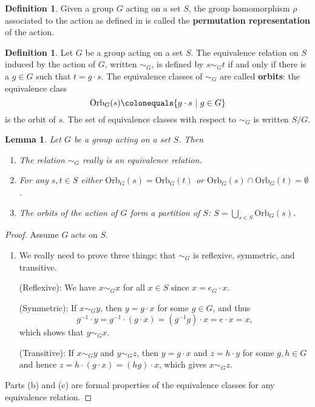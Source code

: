 \documentclass[12pt]{report}
\newtheorem{lemma}[theorem]{Lemma}
\numberwithin{equation}{section}
\numberwithin{theorem}{chapter}
\theoremstyle{definition}
\newtheorem{definition}[theorem]{Definition}
\newtheorem*{basic properties}{Basic Properties}
\newtheorem*{Important Remark}{Important Remark}
\newcommand{\df}[1]{{\bf #1}\index{#1}}
\begin{document}
\begin{definition}
	Given a group $G$ acting on a set $S$, the group homomorphism $\rho$ associated to the action as defined in  is called the \df{permutation representation} of the action.
\end{definition}










\begin{definition}
 Let $G$ be a group acting on a set $S$. The equivalence relation on $S$ induced by the action of $G$, written $\sim_G$, is defined by $s\sim_G t$ if and only if there is a $g \in G$ such that $t=g\cdot s$.  The equivalence classes of $\sim_G$ are called {\bf orbits}: the equivalence class
 $$\mathrm{Orb}_G(s) \colonequals \{g\cdot s \ | \ g\in G\}$$ 
 is the orbit of $s$. The set of equivalence classes with respect to $\sim_G$ is written $S/G$.
 \end{definition}
 
 



 
\begin{lemma}
Let $G$ be a group acting on a set $S$. Then 
\begin{enumerate}[label=(\alph*)]
\item The relation $\sim_G$ really is an equivalence relation.
\item For any $s,t \in S$ either $\mathrm{Orb}_G(s)=\mathrm{Orb}_G(t)$ or $\mathrm{Orb}_G(s)\cap \mathrm{Orb}_G(t)=\emptyset$.
\item The orbits of the action of $G$ form a partition of $S$: $S=\bigcup_{s \in S} \mathrm{Orb}_G(s)$. 
 \end{enumerate}
\end{lemma}

\begin{proof}
  Assume $G$ acts on $S$. 
  
 \begin{enumerate}[label=(\alph*)]
 \item We really need to prove three things: that $\sim_G$ is reflexive, symmetric, and transitive.
 
(Reflexive):  We have $x \sim_G x$ for all $x \in S$ since $x = e_G \cdot x$. 


(Symmetric): If $x \sim_G y$, then $y = g \cdot x$ for some $g \in G$, and thus 
$$g^{-1} \cdot y = g^{-1} \cdot (g \cdot x) = (g^{-1}g) \cdot x = e \cdot x = x,$$ 
which shows that $y \sim_G x$. 

(Transitive): If $x \sim_G y$ and $y \sim_G z$, then $y = g \cdot x$ and $z = h \cdot y$ for some $g, h \in G$ and hence $z = h \cdot (g \cdot x) = (hg) \cdot x$, which gives $x \sim_G z$.
\end{enumerate}

Parts (b) and (c) are formal properties of the equivalence classes for any equivalence relation. 
\end{proof}
\end{document}
